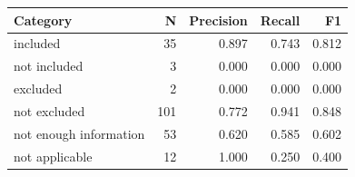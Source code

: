 \begin{tabular}{lrrrr}
\toprule
Category & N & Precision & Recall & F1 \\
\midrule
included & 35 & 0.897 & 0.743 & 0.812 \\
not included & 3 & 0.000 & 0.000 & 0.000 \\
excluded & 2 & 0.000 & 0.000 & 0.000 \\
not excluded & 101 & 0.772 & 0.941 & 0.848 \\
not enough information & 53 & 0.620 & 0.585 & 0.602 \\
not applicable & 12 & 1.000 & 0.250 & 0.400 \\
\bottomrule
\end{tabular}
